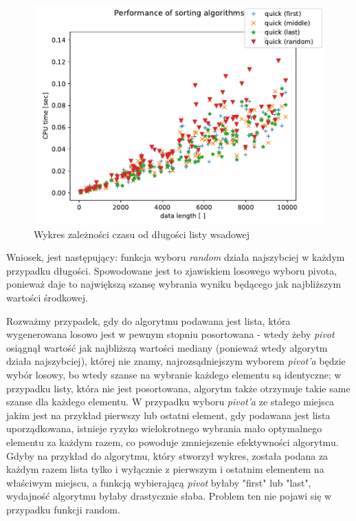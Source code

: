 \documentclass[a4paper,11pt]{report}
\begin{document}
\begin{figure}[h!]
\centering
\includegraphics[scale=0.8]{Figure_1.pdf}
\caption{Wykres zależności czasu od długości listy wsadowej}
\end{figure}


Wniosek, jest następujący: funkcja wyboru \textit{random} działa najszybciej w każdym przypadku długości. Spowodowane jest to zjawiskiem losowego wyboru pivota, ponieważ daje to największą szansę wybrania wyniku będącego jak najbliższym wartości środkowej. 


Rozważmy przypadek, gdy do algorytmu podawana jest lista, która wygenerowana losowo jest w pewnym stopniu posortowana - wtedy żeby \textit{pivot} osiągnął wartość jak najbliższą wartości mediany (ponieważ wtedy algorytm działa najszybciej), której nie znamy, najrozsądniejszym wyborem \textit{pivot'a} będzie wybór losowy, bo wtedy szanse na wybranie każdego elementu są identyczne; w przypadku listy, która nie jest posortowana, algorytm także otrzymuje takie same szanse dla każdego elementu. W przypadku wyboru \textit{pivot'a} ze stałego miejsca jakim jest na przykład pierwszy lub ostatni element, gdy podawana jest lista uporządkowana,  istnieje ryzyko wielokrotnego wybrania mało optymalnego elementu za każdym razem, co powoduje zmniejszenie efektywności algorytmu. Gdyby na przykład do algorytmu, który stworzył wykres, została podana za każdym razem lista tylko i wyłącznie z pierwszym i ostatnim elementem na właściwym miejscu, a funkcją wybierającą \textit{pivot} byłaby "first" lub "last", wydajność algorytmu byłaby drastycznie słaba. Problem ten nie pojawi się w przypadku funkcji random.
\end{document}
